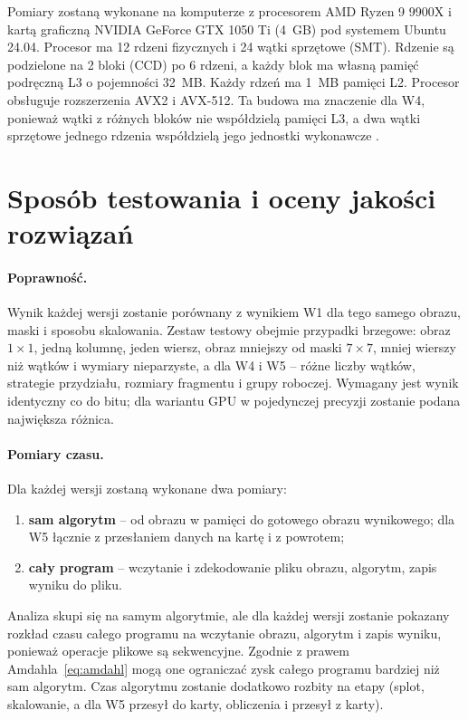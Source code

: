\documentclass[12pt,a4paper]{article}
\begin{document}
Pomiary zostaną wykonane na komputerze z procesorem AMD Ryzen 9 9900X i kartą graficzną NVIDIA GeForce GTX 1050 Ti (4~GB) pod systemem Ubuntu 24.04. Procesor ma 12 rdzeni fizycznych i 24 wątki sprzętowe (SMT). Rdzenie są podzielone na 2 bloki (CCD) po 6 rdzeni, a każdy blok ma własną pamięć podręczną L3 o pojemności 32~MB. Każdy rdzeń ma 1~MB pamięci L2. Procesor obsługuje rozszerzenia AVX2 i AVX-512. Ta budowa ma znaczenie dla W4, ponieważ wątki z różnych bloków nie współdzielą pamięci L3, a dwa wątki sprzętowe jednego rdzenia współdzielą jego jednostki wykonawcze \cite{silberschatz}.

\section{Sposób testowania i oceny jakości rozwiązań}
\label{sec:testy}

\paragraph{Poprawność.} Wynik każdej wersji zostanie porównany z wynikiem W1 dla tego samego obrazu, maski i sposobu skalowania. Zestaw testowy obejmie przypadki brzegowe: obraz $1 \times 1$, jedną kolumnę, jeden wiersz, obraz mniejszy od maski $7\times7$, mniej wierszy niż wątków i wymiary nieparzyste, a dla W4 i W5 -- różne liczby wątków, strategie przydziału, rozmiary fragmentu i grupy roboczej. Wymagany jest wynik identyczny co do bitu; dla wariantu GPU w pojedynczej precyzji zostanie podana największa różnica.

\paragraph{Pomiary czasu.} Dla każdej wersji zostaną wykonane dwa pomiary:
\begin{enumerate}
	\item \textbf{sam algorytm} -- od obrazu w pamięci do gotowego obrazu wynikowego; dla W5 łącznie z przesłaniem danych na kartę i z powrotem;
	\item \textbf{cały program} -- wczytanie i zdekodowanie pliku obrazu, algorytm, zapis wyniku do pliku.
\end{enumerate}
Analiza skupi się na samym algorytmie, ale dla każdej wersji zostanie pokazany rozkład czasu całego programu na wczytanie obrazu, algorytm i zapis wyniku, ponieważ operacje plikowe są sekwencyjne. Zgodnie z prawem Amdahla~\eqref{eq:amdahl} mogą one ograniczać zysk całego programu bardziej niż sam algorytm. Czas algorytmu zostanie dodatkowo rozbity na etapy (splot, skalowanie, a dla W5 przesył do karty, obliczenia i przesył z karty).
\end{document}
